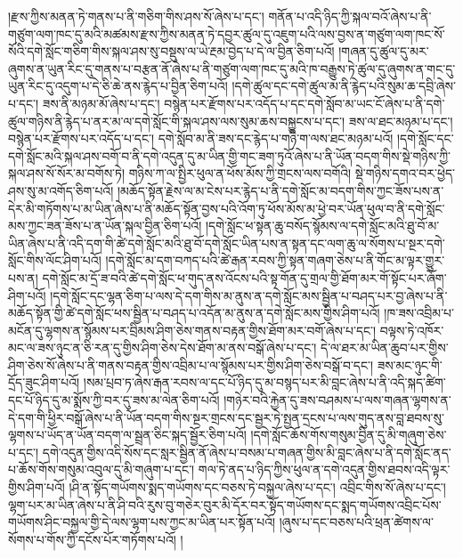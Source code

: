 །རྫས་ཀྱིས་མནན་ཏེ་གནས་པ་ནི་གཅིག་གིས་ཤས་སོ་ཞེས་པ་དང་། གནོན་པ་འདི་ཉིད་ཀྱི་སྐལ་བའོ་ཞེས་པ་ནི་གཙུག་ལག་ཁང་དུ་མའི་མཚམས་རྫས་ཀྱིས་མནན་ཏེ་དབྱར་ཚུལ་དུ་འཇུག་པའི་ལས་བྱས་ན་གཙུག་ལག་ཁང་སོ་སོའི་དགེ་སློང་གཅིག་གིས་སྐལ་ཤས་སུ་བསྡུས་ལ་ཡེ་རྔམ་བྱེད་པ་དེ་ལ་བྱིན་ཅིག་པའོ། །གཞན་དུ་ཚུལ་དུ་མར་ཞུགས་ན་ཡུན་རིང་དུ་གནས་པ་བརྩན་ནོ་ཞེས་པ་ནི་གཙུག་ལག་ཁང་དུ་མའི་ཁ་བརྒྱུས་ཏེ་ཚུལ་དུ་ཞུགས་ན་གང་དུ་ཡུན་རིང་དུ་འདུག་པ་དེ་ཅི་ཆེ་ནས་རྙེད་པ་བྱིན་ཅིག་པའོ། །དགེ་ཚུལ་དང་དགེ་ཚུལ་མ་ནི་རྙེད་པའི་སུམ་ཆ་དབྲི་ཞེས་པ་དང་། ཟས་ནི་མཉམ་མོ་ཞེས་པ་དང་། བསྙེན་པར་རྫོགས་པར་འདོད་པ་དང་དགེ་སློབ་མ་ཡང་ངོ་ཞེས་པ་ནི་དགེ་ཚུལ་གཉིས་ནི་རྙེད་པ་ནར་མ་ལ་དགེ་སློང་གི་སྐལ་ཤས་ལས་སུམ་ཆས་བསྐྱུངས་པ་དང་། ཟས་ལ་ཐང་མཉམ་པ་དང་། བསྙེན་པར་རྫོགས་པར་འདོད་པ་དང་། དགེ་སློབ་མ་ནི་ཟས་དང་རྙེད་པ་གཉི་ག་ལས་ཐང་མཉམ་པའོ། །དགེ་སློང་དང་དགེ་སློང་མའི་སྐལ་ཤས་བགོ་བ་ནི་དགེ་འདུན་དུ་མ་ཡིན་གྱི་གང་ཟག་ཏུའོ་ཞེས་པ་ནི་ཡོན་བདག་གིས་སྡེ་གཉིས་ཀྱི་སྐལ་ཤས་སོ་སོར་མ་བགོས་ཏེ། གཉིས་ཀ་ལ་སྤྱིར་ཕུལ་ན་ཕོས་མོས་ཀྱི་གྲངས་ལས་བགོའི། སྡེ་གཉིས་དགའ་བར་ཕྱེད་ཤས་སུ་མ་འགོད་ཅིག་པའོ། །མཆོད་སྟོན་རྗེས་ལ་མ་ངེས་པར་རྙེད་པ་ནི་དགེ་སློང་མ་བདག་གིས་ཀྱང་ཟོས་པས་ན་དེར་མི་གཏོགས་པ་མ་ཡིན་ཞེས་པ་ནི་མཆོད་སྟོན་བྱས་པའི་འོག་ཏུ་ཕོས་མོས་མ་ཕྱེ་བར་ཡོན་ཕུལ་བ་ནི་དགེ་སློང་མས་ཀྱང་ཟན་ཟོས་པ་ན་ཡོན་སྐལ་བྱིན་ཅིག་པའོ། །དགེ་སློང་ཕ་སྟན་ཆུ་བསོད་སྙོམས་ལ་དགེ་སློང་མའི་ཐུ་བོ་མ་ཡིན་ཞེས་པ་ནི་འདི་དག་གི་ཚེ་དགེ་སློང་མའི་ཐུ་བོ་དགེ་སློང་ཡིན་པས་ན་སྟན་དང་ལག་ཆུ་ལ་སོགས་པ་སྔར་དགེ་སློང་གིས་ལོང་ཤིག་པའོ། །དགེ་སློང་མ་དག་བཀད་པའི་ཚེ་རྒན་རབས་ཀྱི་སྟན་གཞག་ཅེས་པ་ནི་གོང་མ་ལྟར་གྱུར་པས་ན། དགེ་སློང་མ་དྲོ་ཟ་བའི་ཚེ་དགེ་སློང་ཕ་གུད་ནས་འོངས་པའི་སྟ་གོན་དུ་གྲལ་གྱི་ཐོག་མར་གོ་སྟོང་པར་ཞོག་ཤིག་པའོ། །དགེ་སློང་དང་ལྷན་ཅིག་པ་ལས་དེ་དག་གིས་མ་ནུས་ན་དགེ་སློང་མས་སྦྱིན་པ་བཤད་པར་བྱ་ཞེས་པ་ནི་མཆོད་སྟོན་གྱི་ཚེ་དགེ་སློང་ཕས་སྦྱིན་པ་བཤད་པ་འདོན་མ་ནུས་ན་དགེ་སློང་མས་གྱིས་ཤིག་པའོ། །ཁ་ཟས་འབྲིམ་པ་མངོན་དུ་ལྷགས་ན་སྙོམས་པར་བྲིམས་ཤིག་ཅེས་གནས་བརྟན་གྱིས་ཐོག་མར་བགོ་ཞེས་པ་དང་། བལྟས་ཏེ་འཁོར་མང་ལ་ཟས་ཉུང་ན་ཅི་རན་དུ་གྱིས་ཤིག་ཅེས་དེས་ཐོག་མ་ནས་བསྒོ་ཞེས་པ་དང་། དེ་ལ་ཐར་མ་ཡིན་ཆུབ་པར་གྱིས་ཤིག་ཅེས་སོ་ཞེས་པ་ནི་གནས་བརྟན་གྱིས་འབྲིམ་པ་ལ་སྙོམས་པར་གྱིས་ཤིག་ཅེས་བསྒོ་བ་དང་། ཟས་མང་ཉུང་གི་དྲོད་ཟུང་ཤིག་པའོ། །སམ་པྲབ་ཏ་ཞེས་རྒན་རབས་ལ་དང་པོ་ཉིད་དུ་མ་བསྙད་པར་མི་བླང་ཞེས་པ་ནི་འདི་སྐད་ཚིག་དང་པོ་ཉིད་དུ་མ་སྨོས་ཀྱི་བར་དུ་ཟས་མ་ལེན་ཅིག་པའོ། །གཉེར་བའི་རྐྱེན་དུ་ཟས་བཤམས་པ་ལས་གཞན་ལྷགས་ན་དེ་དག་གི་ཕྱིར་བསྒོ་ཞེས་པ་ནི་ཡོན་བདག་གིས་སྔར་གྲངས་དང་སྦྱར་ཏེ་སྤྱན་དྲངས་པ་ལས་གུད་ནས་བླ་ཐབས་སུ་ལྷགས་པ་ཡོད་ན་ཡོན་བདག་ལ་སྦྲན་ཅིང་སྐད་སྦྱོར་ཅིག་པའོ། །དགེ་སློང་ཆོས་གོས་གསུམ་བྱིན་དུ་མི་གཞུག་ཅེས་པ་དང་། དགེ་འདུན་གྱིས་འདི་སོས་དང་སླར་སྦྱིན་ནོ་ཞེས་པ་བསམ་པ་གཞན་གྱིས་མི་བླང་ཞེས་པ་ནི་དགེ་སློང་ནད་པ་ཆོས་གོས་གསུམ་འབུལ་དུ་མི་གཞུག་པ་དང་། གལ་ཏེ་ནད་པ་ཉིད་ཀྱིས་ཕུལ་ན་དགེ་འདུན་གྱིས་ཐབས་འདི་ལྟར་གྱིས་ཤིག་པའོ། །ཤི་ན་སྟོད་གཡོགས་སྨད་གཡོགས་དང་བཅས་ཏེ་བསྐྱལ་ཞེས་པ་དང་། འབྲིང་གིས་སོ་ཞེས་པ་དང་། ལྷག་པར་མ་ཡིན་ཞེས་པ་ནི་ཤི་བའི་རུས་བུ་གཅེར་བུར་མི་དོར་བར་སྟོད་གཡོགས་དང་སྨད་གཡོགས་འབྲིང་པོས་གཡོགས་ཤིང་བསྐྱལ་གྱི་དེ་ལས་ལྷག་པས་ཀྱང་མ་ཡིན་པར་སྟོན་པའོ། །ཞུས་པ་དང་བཅས་པའི་ཕྲན་ཚེགས་ལ་སོགས་པ་གོས་ཀྱི་དངོས་པོར་གཏོགས་པའོ། །
